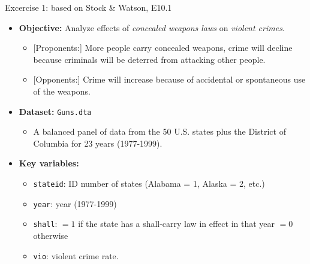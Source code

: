 \documentclass[
  10pt,
  ignorenonframetext,
]{beamer}
\providecommand{\tightlist}{%
  \setlength{\itemsep}{0pt}\setlength{\parskip}{0pt}}
\begin{document}
\begin{frame}[fragile]{Excercise 1: based on Stock \& Watson, E10.1}
\begin{itemize}
\tightlist
\item
  \textbf{Objective:} Analyze effects of \emph{concealed weapons laws}
  on \emph{violent crimes}.

  \begin{itemize}
  \tightlist
  \item
    {[}Proponents:{]} More people carry concealed weapons, crime will
    decline because criminals will be deterred from attacking other
    people.
  \item
    {[}Opponents:{]} Crime will increase because of accidental or
    spontaneous use of the weapons.
  \end{itemize}
\end{itemize}

\vspace{0.8mm}

\begin{itemize}
\tightlist
\item
  \textbf{Dataset:} \texttt{Guns.dta}

  \begin{itemize}
  \tightlist
  \item
    A balanced panel of data from the 50 U.S. states plus the District
    of Columbia for 23 years (1977-1999).
  \end{itemize}
\end{itemize}

\vspace{0.8mm}

\begin{itemize}
\tightlist
\item
  \textbf{Key variables:}

  \begin{itemize}
  \tightlist
  \item
    \texttt{stateid}: ID number of states (Alabama = 1, Alaska = 2,
    etc.)
  \item
    \texttt{year}: year (1977-1999)
  \item
    \texttt{shall}: \(=1\) if the state has a shall-carry law in effect
    in that year \(=0\) otherwise
  \item
    \texttt{vio}: violent crime rate.
  \end{itemize}
\end{itemize}
\end{frame}
\end{document}
